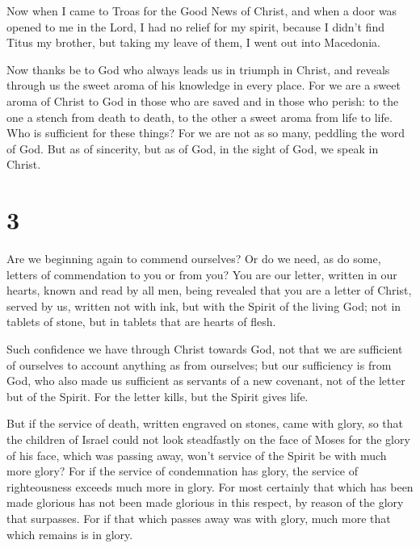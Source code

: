  Now when I came to Troas for the Good News of Christ, and
when a door was opened to me in the Lord,  I had no relief
for my spirit, because I didn't find Titus my brother, but taking my
leave of them, I went out into Macedonia.

 Now thanks be to God who always leads us in triumph in
Christ, and reveals through us the sweet aroma of his knowledge in every
place.  For we are a sweet aroma of Christ to God in those
who are saved and in those who perish:  to the one a stench
from death to death, to the other a sweet aroma from life to life. Who
is sufficient for these things?  For we are not as so many,
peddling the word of God. But as of sincerity, but as of God, in the
sight of God, we speak in Christ.

\hypertarget{section-2}{%
\section{3}\label{section-2}}

 Are we beginning again to commend ourselves? Or do we need,
as do some, letters of commendation to you or from you?  You
are our letter, written in our hearts, known and read by all men,
 being revealed that you are a letter of Christ, served by
us, written not with ink, but with the Spirit of the living God; not in
tablets of stone, but in tablets that are hearts of flesh.

 Such confidence we have through Christ towards God,
 not that we are sufficient of ourselves to account anything
as from ourselves; but our sufficiency is from God,  who
also made us sufficient as servants of a new covenant, not of the letter
but of the Spirit. For the letter kills, but the Spirit gives life.

 But if the service of death, written engraved on stones,
came with glory, so that the children of Israel could not look
steadfastly on the face of Moses for the glory of his face, which was
passing away,  won't service of the Spirit be with much more
glory?  For if the service of condemnation has glory, the
service of righteousness exceeds much more in glory.  For
most certainly that which has been made glorious has not been made
glorious in this respect, by reason of the glory that surpasses.
 For if that which passes away was with glory, much more
that which remains is in glory.

